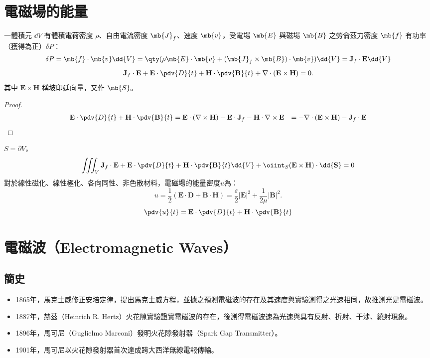 \documentclass[a4paper,12pt]{report}
\begin{document}
\begin{itemize}
\section{電磁場的能量}
一體積元 $\dd{V}$ 有體積電荷密度 $\rho$、自由電流密度 $\mb{J}_f$、速度 $\mb{v}$，受電場 $\mb{E}$ 與磁場 $\mb{B}$ 之勞侖茲力密度 $\mb{f}$ 有功率（獲得為正）$\delta P$：
\[\delta P=\mb{f}\cdot\mb{v}\dd{V}=\qty(\rho\mb{E}\cdot\mb{v}+(\mb{J}_f\times\mb{B})\cdot\mb{v})\dd{V}=\mathbf{J}_f\cdot\mathbf{E}\dd{V}\]
\[\mathbf{J}_f\cdot\mathbf{E}+\mathbf{E}\cdot\pdv{D}{t}+\mathbf{H}\cdot\pdv{\mathbf{B}}{t}+\nabla\cdot(\mathbf{E}\times\mathbf{H})=0.\]
其中 $\mathbf{E}\times\mathbf{H}$ 稱坡印廷向量，又作 $\mb{S}$。
\begin{proof}
\[\begin{aligned}
\mathbf{E}\cdot\pdv{D}{t}+\mathbf{H}\cdot\pdv{\mathbf{B}}{t}&=\mathbf{E}\cdot(\nabla\times\mathbf{H})-\mathbf{E}\cdot\mathbf{J}_f-\mathbf{H}\cdot\nabla \times \mathbf{E}
&=-\nabla\cdot(\mathbf{E}\times\mathbf{H})-\mathbf{J}_f\cdot\mathbf{E}
\end{aligned}\]
\end{proof}
$S=\partial V$，
\[\iiint_V\mathbf{J}_f\cdot\mathbf{E}+\mathbf{E}\cdot\pdv{D}{t}+\mathbf{H}\cdot\pdv{\mathbf{B}}{t}\dd{V}+\oiint_S(\mathbf{E}\times\mathbf{H})\cdot\dd{\mathbf{S}}=0\]
對於線性磁化、線性極化、各向同性、非色散材料，電磁場的能量密度$u$為：
\[u=\frac{1}{2}(\mathbf{E}\cdot\mathbf{D}+\mathbf{B}\cdot\mathbf{H})=\frac{\varepsilon}{2}|\mathbf{E}|^2+\frac{1}{2\mu}|\mathbf{B}|^2.\]
\bpr
\[\pdv{u}{t}=\mathbf{E}\cdot\pdv{D}{t}+\mathbf{H}\cdot\pdv{\mathbf{B}}{t}\]
\epr


\section{電磁波（Electromagnetic Waves）}
\subsection{簡史}
\begin{itemize}
\item 1865年，馬克士威修正安培定律，提出馬克士威方程，並據之預測電磁波的存在及其速度與實驗測得之光速相同，故推測光是電磁波。
\item 1887年，赫茲（Heinrich R. Hertz）火花隙實驗證實電磁波的存在，後測得電磁波速為光速與具有反射、折射、干涉、繞射現象。
\item 1896年，馬可尼（Guglielmo Marconi）發明火花隙發射器（Spark Gap Transmitter）。
\item 1901年，馬可尼以火花隙發射器首次達成跨大西洋無線電報傳輸。
\end{itemize}

\end{itemize}
\end{document}

